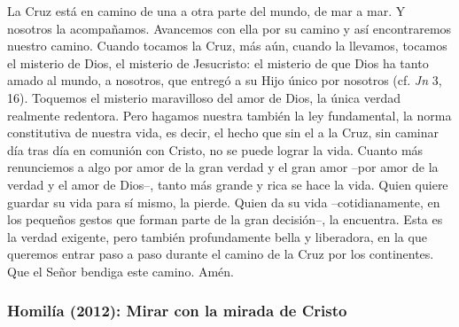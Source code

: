 \begin{body}
 La Cruz está en camino de una a otra parte del mundo, de mar a mar. Y nosotros la acompañamos. Avancemos con ella por su camino y así encontraremos nuestro camino. Cuando tocamos la Cruz, más aún, cuando la llevamos, tocamos el misterio de Dios, el misterio de Jesucristo: el misterio de que Dios ha tanto amado al mundo, a nosotros, que entregó a su Hijo único por nosotros (cf. \textit{Jn} 3, 16). Toquemos el misterio maravilloso del amor de Dios, la única verdad realmente redentora. Pero hagamos nuestra también la ley fundamental, la norma constitutiva de nuestra vida, es decir, el hecho que sin el  a la Cruz, sin caminar día tras día en comunión con Cristo, no se puede lograr la vida. Cuanto más renunciemos a algo por amor de la gran verdad y el gran amor –por amor de la verdad y el amor de Dios–, tanto más grande y rica se hace la vida. Quien quiere guardar su vida para sí mismo, la pierde. Quien da su vida –cotidianamente, en los pequeños gestos que forman parte de la gran decisión–, la encuentra. Esta es la verdad exigente, pero también profundamente bella y liberadora, en la que queremos entrar paso a paso durante el camino de la Cruz por los continentes. Que el Señor bendiga este camino. Amén.
\end{body}

\label{b2-04-01-2009H}
\newpage

\subsubsection{Homilía (2012): Mirar con la mirada de Cristo}


